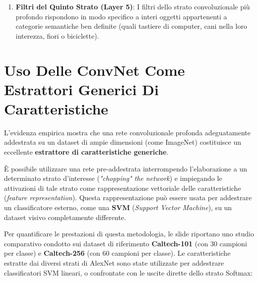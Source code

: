 ﻿\documentclass[11pt, a4paper]{article}
\begin{document}
\begin{enumerate}

    \item \textbf{Filtri del Quinto Strato (Layer 5)}:
    I filtri dello strato convoluzionale più profondo rispondono in modo specifico a interi oggetti appartenenti a categorie semantiche ben definite (quali tastiere di computer, cani nella loro interezza, fiori o biciclette).

\end{enumerate}

\newpage

\section{Uso Delle ConvNet Come Estrattori Generici Di Caratteristiche}

L'evidenza empirica mostra che una rete convoluzionale profonda adeguatamente addestrata su un dataset di ampie dimensioni (come ImageNet) costituisce un eccellente \textbf{estrattore di caratteristiche generiche}.

È possibile utilizzare una rete pre-addestrata interrompendo l'elaborazione a un determinato strato d'interesse (\emph{"chopping" the network}) e impiegando le attivazioni di tale strato come rappresentazione vettoriale delle caratteristiche (\emph{feature representation}). Questa rappresentazione può essere usata per addestrare un classificatore esterno, come una \textbf{SVM} (\emph{Support Vector Machine}), su un dataset visivo completamente differente.

Per quantificare le prestazioni di questa metodologia, le slide riportano uno studio comparativo condotto sui dataset di riferimento \textbf{Caltech-101} (con 30 campioni per classe) e \textbf{Caltech-256} (con 60 campioni per classe). Le caratteristiche estratte dai diversi strati di AlexNet sono state utilizzate per addestrare classificatori SVM lineari, o confrontate con le uscite dirette dello strato Softmax:
\end{document}
